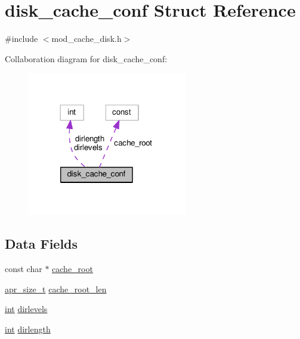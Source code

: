 \hypertarget{structdisk__cache__conf}{}\section{disk\+\_\+cache\+\_\+conf Struct Reference}
\label{structdisk__cache__conf}


{\ttfamily \#include $<$mod\+\_\+cache\+\_\+disk.\+h$>$}



Collaboration diagram for disk\+\_\+cache\+\_\+conf\+:
\nopagebreak
\begin{figure}[H]
\begin{center}
\leavevmode
\includegraphics[width=197pt]{structdisk__cache__conf__coll__graph}
\end{center}
\end{figure}
\subsection*{Data Fields}
\begin{DoxyCompactItemize}
\item 
const char $\ast$ \hyperlink{structdisk__cache__conf_aebfb44bf0fc50cdf40c6b32019fbfd4f}{cache\+\_\+root}
\item 
\hyperlink{group__apr__platform_gaaa72b2253f6f3032cefea5712a27540e}{apr\+\_\+size\+\_\+t} \hyperlink{structdisk__cache__conf_ae04bfadef2ae350f2bf507ca26f2573c}{cache\+\_\+root\+\_\+len}
\item 
\hyperlink{pcre_8txt_a42dfa4ff673c82d8efe7144098fbc198}{int} \hyperlink{structdisk__cache__conf_a8b0138a8eea986bfc75a671f5f4c120e}{dirlevels}
\item 
\hyperlink{pcre_8txt_a42dfa4ff673c82d8efe7144098fbc198}{int} \hyperlink{structdisk__cache__conf_a82027cd1934eedf82232babbf9c8e2f2}{dirlength}
\end{DoxyCompactItemize}


